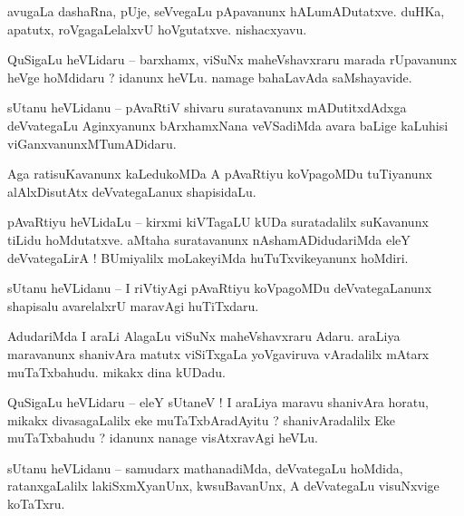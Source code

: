 \documentclass{article}
\begin{document}
\begin{mn}%
avugaLa dashaRna, pUje, seVvegaLu pApavanunx hALumADutatxve. duHKa, apatutx, roVgagaLelalxvU 
hoVgutatxve. nishacxyavu.
\end{mn}

\begin{mn}%
QuSigaLu heVLidaru -- barxhamx, viSuNx maheVshavxraru marada rUpavanunx heVge hoMdidaru ? idanunx 
heVLu. namage bahaLavAda saMshayavide.
\end{mn}

\begin{mn}%
sUtanu heVLidanu -- pAvaRtiV shivaru suratavanunx mADutitxdAdxga deVvategaLu Aginxyanunx 
bArxhamxNana veVSadiMda avara baLige kaLuhisi viGanxvanunxMTumADidaru.
\end{mn}

\begin{mn}%
Aga ratisuKavanunx kaLedukoMDa A pAvaRtiyu koVpagoMDu tuTiyanunx alAlxDisutAtx deVvategaLanux 
shapisidaLu.
\end{mn}

\begin{mn}%
pAvaRtiyu heVLidaLu -- kirxmi kiVTagaLU kUDa suratadalilx suKavanunx tiLidu hoMdutatxve. aMtaha 
suratavanunx nAshamADidudariMda eleY deVvategaLirA ! BUmiyalilx moLakeyiMda huTuTxvikeyanunx 
hoMdiri.
\end{mn}

\begin{mn}%
sUtanu heVLidanu -- I riVtiyAgi pAvaRtiyu koVpagoMDu deVvategaLanunx shapisalu avarelalxrU 
maravAgi huTiTxdaru.
\end{mn}

\begin{mn}%
AdudariMda I araLi AlagaLu viSuNx maheVshavxraru Adaru. araLiya maravanunx shanivAra matutx 
viSiTxgaLa yoVgaviruva vAradalilx mAtarx muTaTxbahudu. mikakx dina kUDadu.
\end{mn}


\begin{mn}%
QuSigaLu heVLidaru -- eleY sUtaneV ! I araLiya maravu shanivAra horatu, mikakx divasagaLalilx eke 
muTaTxbAradAyitu ? shanivAradalilx Eke muTaTxbahudu ? idanunx nanage visAtxravAgi heVLu.
\end{mn}

\begin{mn}%
sUtanu heVLidanu -- samudarx mathanadiMda, deVvategaLu hoMdida, ratanxgaLalilx lakiSxmXyanUnx, 
kwsuBavanUnx, A deVvategaLu visuNxvige koTaTxru.
\end{mn}
\end{document}

